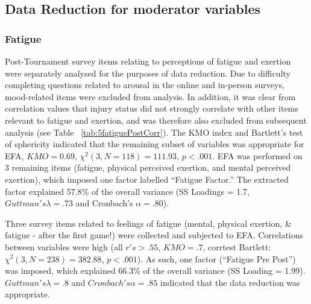{\newpage
{} %
\begin{landscape}






\clearpage




\clearpage




\end{landscape}
\restoregeometry


\subsection{\label{app:moderatorVarsEFA}Data Reduction for moderator variables}

\subsubsection{Fatigue}
Post-Tournament survey items relating to perceptions of fatigue and exertion were separately analysed for the purposes of data reduction.  Due to difficulty completing questions related to arousal in the online and in-person surveys, mood-related items were excluded from analysis.  In addition, it was clear from correlation values that injury status did not strongly correlate with other items relevant to fatigue and exertion, and was therefore also excluded from subsequent analysis (see Table ~\ref{tab:5fatiguePostCorr}).  The KMO index and Bartlett's test of sphericity indicated that the remaining subset of variables was appropriate for EFA, $KMO =  0.69$, $\chi^2(3, N = 118) = 111.93$, $p < .001$. EFA was performed on 3 remaining items (fatigue, physical perceived exertion, and mental perceived exertion), which imposed one factor labelled ``Fatigue Factor.''  The extracted factor explained 57.8\% of the overall variance (SS Loadings = 1.7, $Guttman's\lambda =.73$ and Cronbach's $\alpha = .80$).

Three survey items related to feelings of fatigue (mental, physical exertion, & fatigue - after the first game!)  were collected and subjected to EFA.
Correlations between variables were high (all $r's > .55$, $KMO = .7$, corrtest Bartlett: $\chi^2(3, N = 238) = 382.88$, $p < .001$).  As such, one factor (``Fatigue Pre Post'') was imposed, which explained 66.3\% of the overall variance (SS Loading = 1.99).  $Guttman's \lambda =.8$ and $Cronbach's \alpha = .85$ indicated that the data reduction was appropriate.

}
